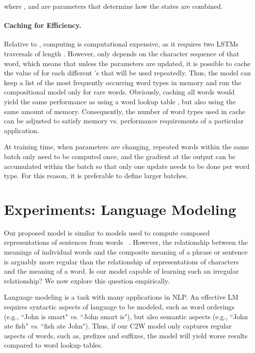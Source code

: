 \documentclass[11pt]{article}
\begin{document}
\begin{CJK*}{UTF8}{gbsn}
where ,  and  are parameters that determine how the states are combined. 

\paragraph{Caching for Efficiency.} Relative to , computing  is computational expensive, as it requires two LSTMs traversals of length . However,  only depends on the character sequence of that word, which means that unless the parameters are updated, it is possible to cache the value of  for each different 's that will be used repeatedly. Thus, the model can keep a list of the most frequently occurring word types in memory and run the compositional model only for rare words. Obviously, caching all words would yield the same performance as using a word lookup table , but also using the same amount of memory. Consequently, the number of word types used in cache can be adjusted to satisfy memory vs. performance requirements of a particular application.

At training time, when parameters are changing, repeated words within the same batch only need to be computed once, and the gradient at the output can be accumulated within the batch so that only one update needs to be done per word type. For this reason, it is preferable to define larger batches.



\section{Experiments: Language Modeling}
\label{sec:lang}

Our proposed model is similar to models used to compute composed representations of sentences from words ~\cite{cho-EtAl:2014:EMNLP2014,DBLP:journals/corr/LiJH15}. However, the relationship between the meanings of individual words and the composite meaning of a phrase or sentence is arguably more regular than the relationship of representations of characters and the meaning of a word. Is our model capable of learning such an irregular relationship? We now explore this question empirically. 

Language modeling is a task with many applications in NLP.  An effective LM requires syntactic aspects of language to be modeled, such as word orderings (e.g., ``John is smart" \emph{vs}. ``John smart is"), but also semantic aspects (e.g., ``John ate fish" \emph{vs}. ``fish ate John"). Thus, if our C2W model only captures regular aspects of words, such as, prefixes and suffixes, the model will yield worse results compared to word lookup tables.


\end{CJK*}
\end{document}
